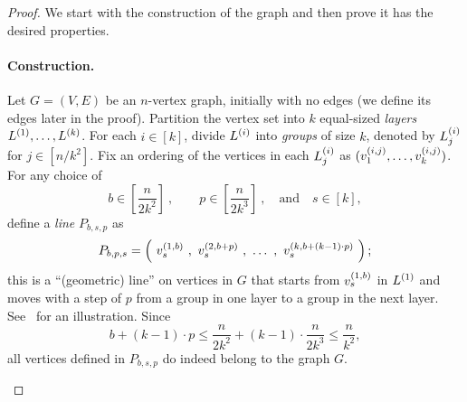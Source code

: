 \documentclass[11pt]{article}
\theoremstyle{definition}
\renewcommand{\leq}{\leqslant}
\newcommand{\paren}[1]{\ensuremath{\left(#1\right)}\xspace}
\begin{document}
\begin{proof} We start with the construction of the graph and then prove it has the desired properties. 

	\paragraph{Construction.} 	Let $G=(V,E)$ be an $n$-vertex graph, initially with no edges (we define its edges later in the proof). Partition the vertex set into $k$ equal-sized \emph{layers} $L^{(1)}, \ldots, L^{(k)}$. For each $i\in [k]$, divide $L^{(i)}$ into \emph{groups} of size $k$, 
	denoted by $L^{(i)}_j$ for $j \in [n/k^2]$.   Fix an ordering of the vertices in each $L^{(i)}_j$ as $(v^{(i,j)}_1,\ldots,v^{(i,j)}_k)$. For any choice of 
	\[
	b \in [\frac{n}{2k^2}]~, \qquad p\in [\frac{n}{2k^3}]~, \quad \text{and}\quad s\in [k],
	\]
	define a \emph{line} $P_{b,s,p}$ as
	\[
		  P_{b,p,s} = \paren{~\vij{1}{b}_s~,~\vij{2}{b+p}_s~,~\ldots~,~\vij{k}{b+(k-1) \cdot p}_s~};
	\]
	this is a ``(geometric) line'' on vertices in $G$ that starts from $v^{(1,b)}_s$ in $L^{(1)}$ and moves with a step of $p$ from a group in one layer to a group in the next layer. See~ for an illustration. 
	Since 
	\[
		b+(k-1) \cdot p \leq \frac{n}{2k^2} + (k-1) \cdot \frac{n}{2k^3} \leq \frac{n}{k^2},
	\]
	all vertices defined in $P_{b,s,p}$ do indeed belong to the graph $G$.  
	
	
\begin{figure}[h!]
\centering

\end{figure}
\end{proof}
\end{document}
